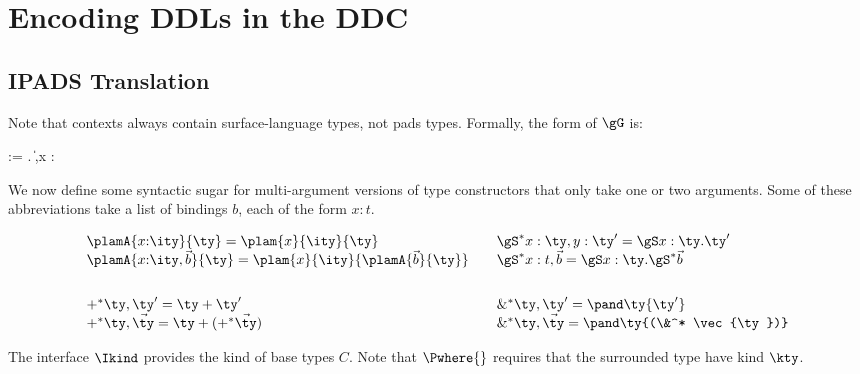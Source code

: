 \section{Encoding DDLs in the DDC}

\subsection{IPADS Translation}
\label{sec:trans-sl}

Note that contexts always contain surface-language types, not pads
types. Formally, the form of $\gG$ is:
\begin{bnf}
\name{} \meta{\gG} \::= . \| \gG,x {:} \ity
\end{bnf}

We now define some syntactic sugar for multi-argument versions of type
constructors that only take one or two arguments. Some of these
abbreviations take a list of bindings $b$, each of the form $x{:}t$.

\begin{align*}
  &\begin{array}{l}
    \plamA{x{:}\ity}{\ty} = \plam{x}{\ity}{\ty} \\
    \plamA{x{:}\ity,\vec{b}}{\ty} = \plam{x}{\ity}{\plamA{\vec{b}}{\ty}}
  \end{array}
  &
  &\begin{array}{l}
    \gS^* x:\ty,y:\ty' = \gS x:\ty.\ty' \\
    \gS^* x:t,\vec b   = \gS x:\ty.\gS^* \vec b
  \end{array}
  \\ \\
  &\begin{array}{l}
    +^* \ty,\ty' = \ty + \ty'\\
    +^* \ty,\vec{\ty} = \ty + (+^* \vec{\ty})
  \end{array}
  &
  &\begin{array}{l}
    \&^* \ty,\ty' =\pand \ty {\ty'}\\
    \&^* \ty,\vec{\ty} = \pand \ty {(\&^* \vec{\ty})}
  \end{array}
\end{align*}

The interface $\Ikind$ provides the kind of base
types $C$. Note that $\Pwhere{}$ requires that the surrounded type
have kind $\kty$.

